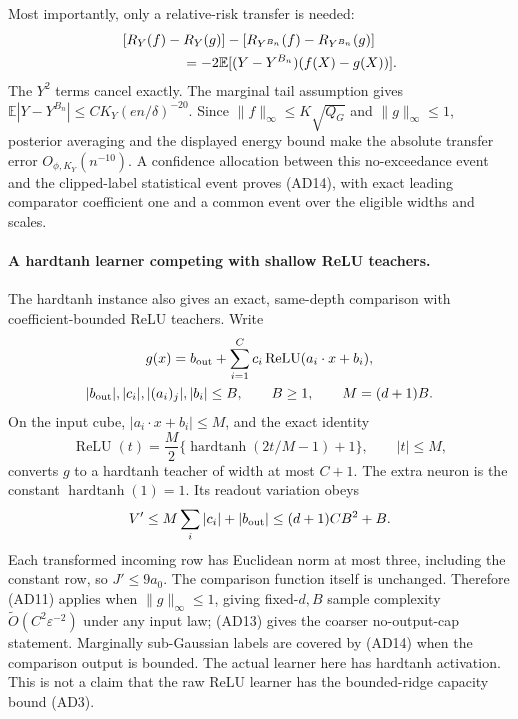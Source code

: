 Most importantly, only a relative-risk transfer is needed:
\begin{align*}
 &[R_Y(f)-R_Y(g)]-[R_{Y^{B_n}}(f)-R_{Y^{B_n}}(g)]\\
 &\hspace{15mm}=-2\mathbb E[(Y-Y^{B_n})(f(X)-g(X))].
\end{align*}
The $Y^2$ terms cancel exactly. The marginal tail assumption gives
$\mathbb E|Y-Y^{B_n}|\le C K_Y(e n/\delta)^{-20}$.
Since $\|f\|_\infty\le K\sqrt{Q_G}$ and $\|g\|_\infty\le1$,
posterior averaging and the displayed energy bound make the absolute
transfer error $O_{\phi,K_Y}(n^{-10})$. A confidence allocation between
this no-exceedance event and the clipped-label statistical event proves
(AD14), with exact leading comparator coefficient one and a common
event over the eligible widths and scales.

\paragraph{A hardtanh learner competing with shallow ReLU teachers.}
The hardtanh instance also gives an exact, same-depth comparison with
coefficient-bounded ReLU teachers. Write
\begin{gather*}
 g(x)=b_{\rm out}+\sum_{i=1}^C c_i\operatorname{ReLU}(a_i\cdot x+b_i),\\
 |b_{\rm out}|,|c_i|,|(a_i)_j|,|b_i|\le B,
 \qquad B\ge1,\qquad M=(d+1)B.
\end{gather*}
On the input cube, $|a_i\cdot x+b_i|\le M$, and the exact identity
\[
 \operatorname{ReLU}(t)
 =\frac M2\{\operatorname{hardtanh}(2t/M-1)+1\},\qquad |t|\le M,
\]
converts $g$ to a hardtanh teacher of width at most $C+1$.
The extra neuron is the constant $\operatorname{hardtanh}(1)=1$.
Its readout variation obeys
\[
 V'\le M\sum_i|c_i|+|b_{\rm out}|
 \le(d+1)CB^2+B.
\]
Each transformed incoming row has Euclidean norm at most three,
including the constant row, so $J'\le9a_0$.
The comparison function itself is unchanged. Therefore (AD11) applies
when $\|g\|_\infty\le1$, giving fixed-$d,B$ sample complexity
$\widetilde O(C^2\varepsilon^{-2})$ under any input law; (AD13) gives
the coarser no-output-cap statement. Marginally sub-Gaussian labels are
covered by (AD14) when the comparison output is bounded.
The actual learner here has hardtanh activation. This is not a claim
that the raw ReLU learner has the bounded-ridge capacity bound (AD3).

